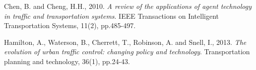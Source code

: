 \documentclass[twoside,leqno,twocolumn]{article}
\begin{document}


\begin{thebibliography}{99}

Chen, B. and Cheng, H.H., 2010. {\em A review of the applications of agent technology in traffic and transportation systems}. IEEE Transactions on Intelligent Transportation Systems, 11(2), pp.485-497.

Hamilton, A., Waterson, B., Cherrett, T., Robinson, A. and Snell, I., 2013. {\em The evolution of urban traffic control: changing policy and technology}. Transportation planning and technology, 36(1), pp.24-43.

%

\end{thebibliography}
\end{document}
